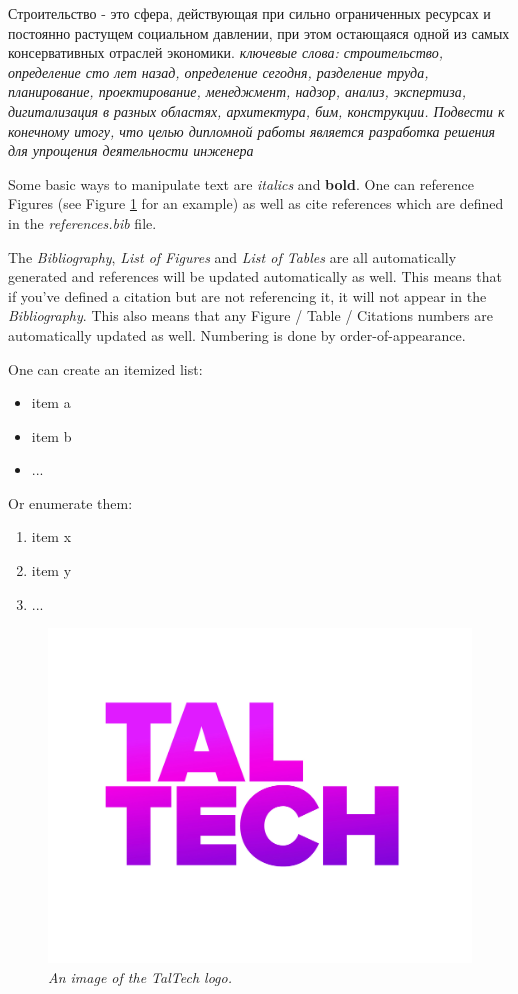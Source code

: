 Строительство - это сфера, действующая при сильно ограниченных ресурсах и постоянно растущем социальном давлении, при этом остающаяся одной из самых консервативных отраслей экономики. 
\textit{ключевые слова: строительство, определение сто лет назад, определение сегодня, разделение труда, планирование, проектирование, менеджмент, надзор, анализ, экспертиза,
дигитализация в разных областях, архитектура, бим, конструкции. Подвести к конечному итогу, что целью дипломной работы является разработка решения для упрощения деятельности инженера }



Some basic ways to manipulate text are \textit{italics} and \textbf{bold}. One can reference Figures (see Figure \ref{fig:taltech} for an example) as well as cite references which are defined in the \textit{references.bib} file.\cite{spectre,example-reference} 

The \textit{Bibliography}, \textit{List of Figures} and \textit{List of Tables} are all automatically generated and references will be updated automatically as well. This means that if you've defined a citation but are not referencing it, it will not appear in the \textit{Bibliography}. This also means that any Figure / Table / Citations numbers are automatically updated as well. Numbering is done by order-of-appearance.

One can create an itemized list:
\begin{itemize}
    \item item a
    \item item b
    \item ...
\end{itemize}

Or enumerate them:
\begin{enumerate}
    \item item x
    \item item y
    \item ...
\end{enumerate}


\begin{figure}[ht]
    \centering
    \includegraphics[width=.5\textwidth]{figures/taltech.jpg}
    \caption{\textit{An image of the TalTech logo.}}
    \label{fig:taltech}
\end{figure}


